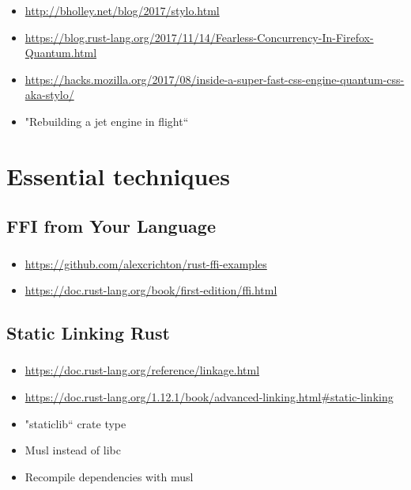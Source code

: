 \documentclass{beamer}
\begin{document}
\begin{frame}[fragile]
\frametitle{\insertsubsectionhead}
\begin{itemize}
\item \url{http://bholley.net/blog/2017/stylo.html}
\item \url{https://blog.rust-lang.org/2017/11/14/Fearless-Concurrency-In-Firefox-Quantum.html}
\item \url{https://hacks.mozilla.org/2017/08/inside-a-super-fast-css-engine-quantum-css-aka-stylo/}
\item "Rebuilding a jet engine in flight``
\end{itemize}
\end{frame}

\section{Essential techniques}

\subsection{FFI from Your Language}

\begin{frame}[fragile]
\frametitle{\insertsubsectionhead}
\begin{itemize}
\item \url{https://github.com/alexcrichton/rust-ffi-examples}
\item \url{https://doc.rust-lang.org/book/first-edition/ffi.html}
\end{itemize}
\end{frame}



\subsection{Static Linking Rust}

\begin{frame}[fragile]
\frametitle{\insertsubsectionhead}

\begin{itemize}
\item \url{https://doc.rust-lang.org/reference/linkage.html}
\item \url{https://doc.rust-lang.org/1.12.1/book/advanced-linking.html#static-linking}
\item "staticlib`` crate type
\item Musl instead of libc
\item Recompile dependencies with musl
\end{itemize}

\end{frame}
\end{document}
